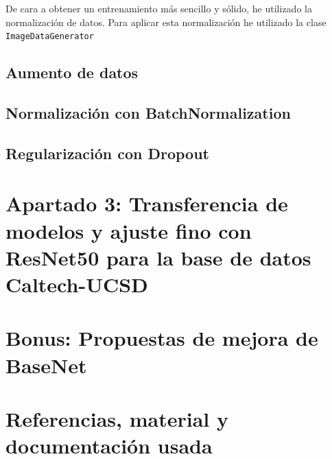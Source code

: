 \documentclass[12pt, spanish]{article}
\begin{document}
De cara a obtener un entrenamiento más sencillo y sólido, he utilizado la normalización de datos. Para aplicar esta normalización he utilizado la clase \texttt{ImageDataGenerator}\cite{imagedatagenerator}



\subsection{Aumento de datos}



\subsection{Normalización con BatchNormalization}


\subsection{Regularización con Dropout}







\section{Apartado 3: Transferencia de modelos y ajuste fino con ResNet50 para la base de datos Caltech-UCSD}

\section{Bonus: Propuestas de mejora de BaseNet}


\newpage

\section{Referencias, material y documentación usada}
\end{document}
